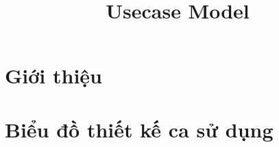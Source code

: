 \documentclass[12pt, a4paper]{article}
\title{Usecase Model}
\begin{document}

\clearpage


\clearpage

\tableofcontents
\clearpage

\section{Giới thiệu}

\clearpage

\section{Biểu đồ thiết kế ca sử dụng}


\glsaddall
\printglossary[title={Giải thích thuật ngữ}]
\end{document}
